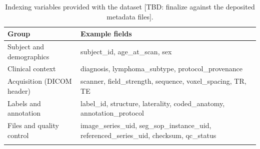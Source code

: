 \begin{table}[h]
\caption{Indexing variables provided with the dataset [TBD: finalize against the deposited metadata files].}\label{tab:vars}
\begin{tabular}{@{}ll@{}}
\toprule
Group & Example fields \\
\midrule
Subject and demographics   & subject\_id, age\_at\_scan, sex \\
Clinical context           & diagnosis, lymphoma\_subtype, protocol\_provenance \\
Acquisition (DICOM header) & scanner, field\_strength, sequence, voxel\_spacing, TR, TE \\
Labels and annotation      & label\_id, structure, laterality, coded\_anatomy, annotation\_protocol \\
Files and quality control  & image\_series\_uid, seg\_sop\_instance\_uid, referenced\_series\_uid, checksum, qc\_status \\
\botrule
\end{tabular}
\end{table}
